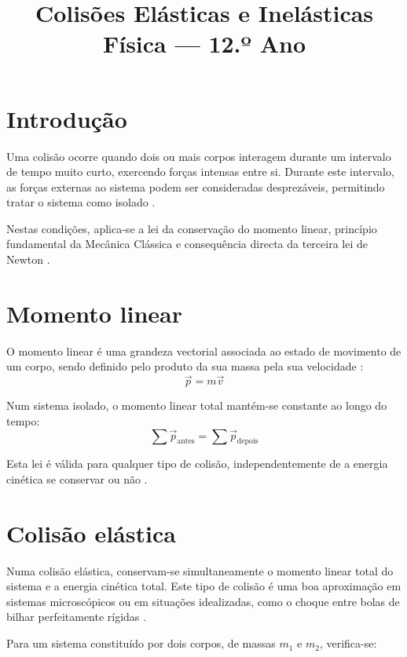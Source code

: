\documentclass[12pt,a4paper]{article}
\title{\textbf{Colisões Elásticas e Inelásticas}\\
	Física — 12.º Ano}
\author{}
\date{}
\begin{document}
	\maketitle
	
	\section{Introdução}
	
	Uma colisão ocorre quando dois ou mais corpos interagem durante um intervalo de tempo muito curto, exercendo forças intensas entre si. Durante este intervalo, as forças externas ao sistema podem ser consideradas desprezáveis, permitindo tratar o sistema como isolado \cite{halliday}.
	
	Nestas condições, aplica-se a lei da conservação do momento linear, princípio fundamental da Mecânica Clássica e consequência directa da terceira lei de Newton \cite{serway}.
	
	\section{Momento linear}
	
	O momento linear é uma grandeza vectorial associada ao estado de movimento de um corpo, sendo definido pelo produto da sua massa pela sua velocidade \cite{tipler}:
	\[
	\vec{p} = m \vec{v}
	\]
	
	Num sistema isolado, o momento linear total mantém-se constante ao longo do tempo:
	\[
	\sum \vec{p}_{\text{antes}} = \sum \vec{p}_{\text{depois}}
	\]
	
	Esta lei é válida para qualquer tipo de colisão, independentemente de a energia cinética se conservar ou não \cite{dge}.
	
	\section{Colisão elástica}
	
	Numa colisão elástica, conservam-se simultaneamente o momento linear total do sistema e a energia cinética total. Este tipo de colisão é uma boa aproximação em sistemas microscópicos ou em situações idealizadas, como o choque entre bolas de bilhar perfeitamente rígidas \cite{halliday}.
	
	Para um sistema constituído por dois corpos, de massas \(m_1\) e \(m_2\), verifica-se:
	
\end{document}
